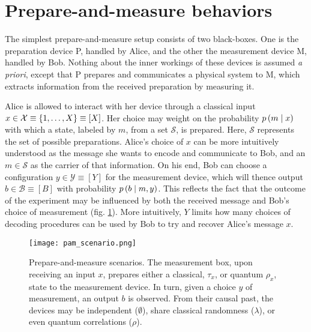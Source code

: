     \section{Prepare-and-measure behaviors}

        The simplest prepare-and-measure setup consists of two black-boxes. One is the preparation device P, handled by Alice, and the other the measurement device M, handled by Bob. Nothing about the inner workings of these devices is assumed \emph{a priori}, except that P prepares and communicates a physical system to M, which extracts information from the received preparation by measuring it.
    
        Alice is allowed to interact with her device through a classical input $x \in \mathcal{X} \equiv \{ 1, \ldots, X \} \equiv [X]$. Her choice may weight on the probability $p \left( m \mid x \right)$ with which a state, labeled by $m$, from a set $\mathcal{S}$, is prepared. Here, $\mathcal{S}$ represents the set of possible preparations. Alice's choice of $x$ can be more intuitively understood as the message she wants to encode and communicate to Bob, and an $m \in \mathcal{S}$ as the carrier of that information. On his end, Bob can choose a configuration $y \in \mathcal{Y} \equiv [Y]$ for the measurement device, which will thence output $b \in \mathcal{B} \equiv [B]$ with probability $p \left( b \mid m,y \right)$. This reflects the fact that the outcome of the experiment may be influenced by both the received message and Bob's choice of measurement (fig. \ref{fig:pam-scenario}). More intuitively, $Y$ limits how many choices of decoding procedures can be used by Bob to try and recover Alice's message $x$.

		\begin{figure}
			\begin{minipage}[c]{0.41\textwidth}
				\centering
				\texttt{[image: pam\_scenario.png]}
			\end{minipage}
			\begin{minipage}[c]{0.58\textwidth}
				\caption{Prepare-and-measure scenarios. The measurement box, upon receiving an input $x$, prepares either a classical, $\tau_x$, or quantum $\rho_x$, state to the measurement device. In turn, given a choice $y$ of measurement, an output $b$ is observed. From their causal past, the devices may be independent ($\emptyset$), share classical randomness ($\lambda$), or even quantum correlations ($\rho$).}	
				\label{fig:pam-scenario}
			\end{minipage}
		\end{figure}


